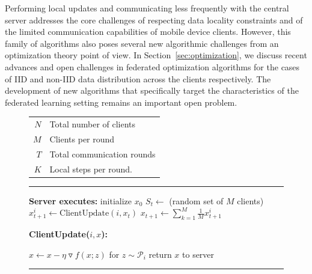 \documentclass[11pt]{article}
\newcommand{\SUB}[1]{\ENSURE \hspace{-0.15in} \textbf{#1}}
\begin{document}
Performing local updates and  communicating less frequently with the central server addresses the core challenges of respecting data locality constraints and of the limited communication capabilities of mobile device clients. However, this family of algorithms also poses several new algorithmic challenges from an optimization theory point of view. In Section~\ref{sec:optimization}, we discuss recent advances and open challenges in federated optimization algorithms for the cases of IID and non-IID data distribution across the clients respectively. The development of new algorithms that specifically target the characteristics of the federated learning setting remains an important open problem.

\newcommand{\grad}{\triangledown}
\newcommand{\T}{\rule{0pt}{2.2ex}}

\begin{figure}

\begin{minipage}[t]{.4\textwidth}
\begin{tabular}[t]{rl}    
\toprule
\T $N$ & Total number of clients \\
\T $M$ & Clients per round \\
\T $T$ & Total communication rounds \\
\T $K$ & Local steps per round. \\
\bottomrule
\end{tabular}
\label{tab:notation}
\vfill
\end{minipage}
\hfill
%
%
%
\begin{minipage}[t]{.55\textwidth}
\rule{\textwidth}{\heavyrulewidth}  %
\vspace{-0.16in}
\begin{algorithmic}
\renewcommand{\arraystretch}{1.6}
\SUB{Server executes:}
  \STATE initialize $x_0$
     \STATE $S_t \leftarrow$ (random set of $M$ clients)
      \STATE $x_{t+1}^i \leftarrow \text{ClientUpdate}(i, x_t)$ 
     \ENDFOR
     \STATE $x_{t+1} \leftarrow \sum_{k=1}^M \frac{1}{M} x_{t+1}^i$
  \ENDFOR
  \STATE

 \SUB{ClientUpdate($i, x$):}\ \ \
     
      \STATE $x \leftarrow x - \eta \grad f(x; z)$ for $z \sim \mathcal{P}_i$
    \ENDFOR
 \STATE return $x$ to server
 \end{algorithmic}
 \rule{\textwidth}{\heavyrulewidth}
 \label{alg:fedavg}
 \vfill
\end{minipage}

\end{figure}
\end{document}

